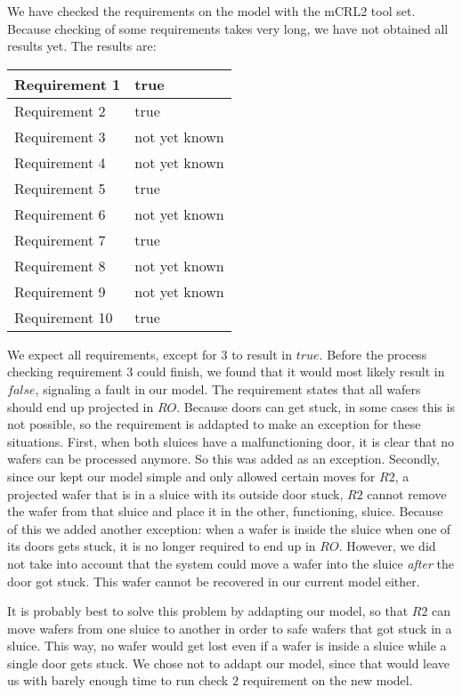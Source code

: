 We have checked the requirements on the model with the mCRL2 tool set. Because checking of some requirements takes very long, we have not obtained all results yet. The results are:
\begin{tabular}{|l|l|}
\hline
Requirement 1 & true \\
\hline
Requirement 2 & true \\
\hline
Requirement 3 & not yet known \\
\hline
Requirement 4 & not yet known \\
\hline
Requirement 5 & true \\
\hline
Requirement 6 & not yet known \\
\hline
Requirement 7 & true \\
\hline
Requirement 8 & not yet known \\
\hline
Requirement 9 & not yet known \\
\hline
Requirement 10 & true \\
\hline
\end{tabular}

We expect all requirements, except for $3$ to result in $true$. Before the process checking requirement $3$ could finish, we found that it would most likely result in $false$, signaling a fault in our model. The requirement states that all wafers should end up projected in $RO$. Because doors can get stuck, in some cases this is not possible, so the requirement is addapted to make an exception for these situations. First, when both sluices have a malfunctioning door, it is clear that no wafers can be processed anymore. So this was added as an exception. Secondly, since our kept our model simple and only allowed certain moves for $R2$, a projected wafer that is in a sluice with its outside door stuck, $R2$ cannot remove the wafer from that sluice and place it in the other, functioning, sluice. Because of this we added another exception: when a wafer is inside the sluice when one of its doors gets stuck, it is no longer required to end up in $RO$. However, we did not take into account that the system could move a wafer into the sluice \emph{after} the door got stuck. This wafer cannot be recovered in our current model either.

It is probably best to solve this problem by addapting our model, so that $R2$ can move wafers from one sluice to another in order to safe wafers that got stuck in a sluice. This way, no wafer would get lost even if a wafer is inside a sluice while a single door gets stuck. We chose not to addapt our model, since that would leave us with barely enough time to run check $2$ requirement on the new model.